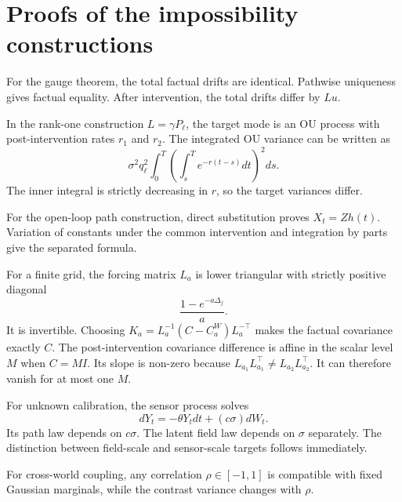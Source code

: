\section{Proofs of the impossibility constructions}

For the gauge theorem, the total factual drifts are identical. Pathwise uniqueness gives factual equality. After intervention, the total drifts differ by $Lu$.

In the rank-one construction $L=\gamma P_\ell$, the target mode is an OU process with post-intervention rates $r_1$ and $r_2$. The integrated OU variance can be written as
\[
 \sigma^2q_\ell^2\int_0^T
 \left(\int_s^Te^{-r(t-s)}dt\right)^2ds.
\]
The inner integral is strictly decreasing in $r$, so the target variances differ.

For the open-loop path construction, direct substitution proves $X_t=Zh(t)$. Variation of constants under the common intervention and integration by parts give the separated formula.

For a finite grid, the forcing matrix $L_a$ is lower triangular with strictly positive diagonal
\[
 \frac{1-e^{-a\Delta_j}}a.
\]
It is invertible. Choosing $K_a=L_a^{-1}(C-C_a^W)L_a^{-\top}$ makes the factual covariance exactly $C$. The post-intervention covariance difference is affine in the scalar level $M$ when $C=MI$. Its slope is non-zero because $L_{a_1}L_{a_1}^\top\ne L_{a_2}L_{a_2}^\top$. It can therefore vanish for at most one $M$.

For unknown calibration, the sensor process solves
\[
 dY_t=-\theta Y_tdt+(c\sigma)dW_t.
\]
Its path law depends on $c\sigma$. The latent field law depends on $\sigma$ separately. The distinction between field-scale and sensor-scale targets follows immediately.

For cross-world coupling, any correlation $\rho\in[-1,1]$ is compatible with fixed Gaussian marginals, while the contrast variance changes with $\rho$.
